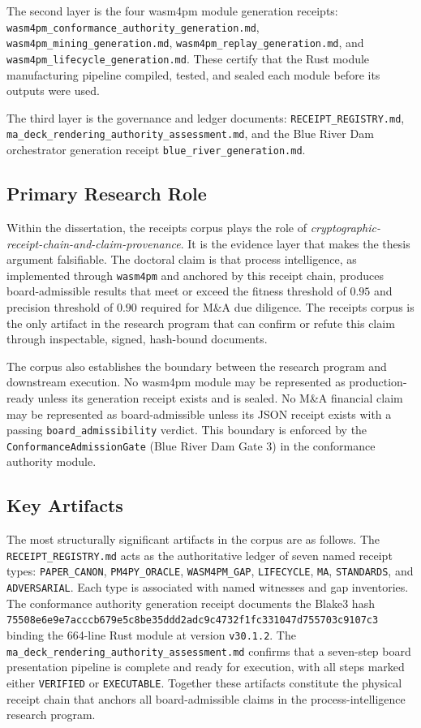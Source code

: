 The second layer is the four wasm4pm module generation receipts:
\texttt{wasm4pm\_conformance\_authority\_generation.md},
\texttt{wasm4pm\_mining\_generation.md}, \texttt{wasm4pm\_replay\_generation.md}, and
\texttt{wasm4pm\_lifecycle\_generation.md}. These certify that the Rust module manufacturing
pipeline compiled, tested, and sealed each module before its outputs were used.

The third layer is the governance and ledger documents:
\texttt{RECEIPT\_REGISTRY.md}, \texttt{ma\_deck\_rendering\_authority\_assessment.md}, and
the Blue River Dam orchestrator generation receipt \texttt{blue\_river\_generation.md}.

\subsection{Primary Research Role}
\label{sec:receipts-identity-role}

Within the dissertation, the receipts corpus plays the role of \emph{cryptographic-receipt-chain-and-claim-provenance}. It is the evidence layer that makes the thesis argument falsifiable. The doctoral claim is that process intelligence, as implemented through \texttt{wasm4pm} and anchored by this receipt chain, produces board-admissible results that meet or exceed the fitness threshold of $0.95$ and precision threshold of $0.90$ required for M\&A due diligence. The receipts corpus is the only artifact in the research program that can confirm or refute this claim through inspectable, signed, hash-bound documents.

The corpus also establishes the boundary between the research program and downstream execution. No wasm4pm module may be represented as production-ready unless its generation receipt exists and is sealed. No M\&A financial claim may be represented as board-admissible unless its JSON receipt exists with a passing \texttt{board\_admissibility} verdict. This boundary is enforced by the \texttt{ConformanceAdmissionGate} (Blue River Dam Gate 3) in the conformance authority module.

\subsection{Key Artifacts}
\label{sec:receipts-identity-artifacts}

The most structurally significant artifacts in the corpus are as follows. The
\texttt{RECEIPT\_REGISTRY.md} acts as the authoritative ledger of seven named receipt types:
\texttt{PAPER\_CANON}, \texttt{PM4PY\_ORACLE}, \texttt{WASM4PM\_GAP}, \texttt{LIFECYCLE},
\texttt{MA}, \texttt{STANDARDS}, and \texttt{ADVERSARIAL}. Each type is associated with named
witnesses and gap inventories. The conformance authority generation receipt documents the Blake3
hash \texttt{75508e6e9e7acccb679e5c8be35ddd2adc9c4732f1fc331047d755703c9107c3} binding the
664-line Rust module at version \texttt{v30.1.2}. The \texttt{ma\_deck\_rendering\_authority\_assessment.md}
confirms that a seven-step board presentation pipeline is complete and ready for execution,
with all steps marked either \texttt{VERIFIED} or \texttt{EXECUTABLE}. Together these artifacts
constitute the physical receipt chain that anchors all board-admissible claims in the
process-intelligence research program.
